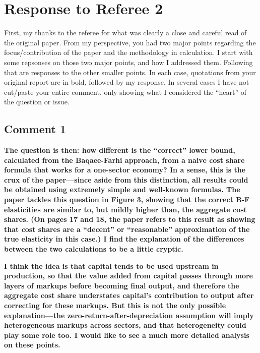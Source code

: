 \documentclass[11pt]{article}
\begin{document}


\section*{Response to Referee 2}
\onehalfspacing 

First, my thanks to the referee for what was clearly a close and careful read of the original paper. From my perspective, you had two major points regarding the focus/contribution of the paper and the methodology in calculation. I start with some repsonses on those two major points, and how I addressed them. Following that are responses to the other smaller points. In each case, quotations from your original report are in bold, followed by my response. In several cases I have not cut/paste your entire comment, only showing what I considered the ``heart'' of the question or issue.

\subsection*{Comment 1}
\textbf{The question is then: how different is the “correct” lower bound, calculated from the Baqaee-Farhi approach, from a naive cost share formula that works for a one-sector economy? In a sense, this is the crux of the paper—since aside from this distinction, all results could be obtained using extremely simple and well-known formulas. The paper tackles this question in Figure 3, showing that the correct B-F elasticities are similar to, but mildly higher than, the aggregate cost shares. (On pages 17 and 18, the paper refers to this result as showing that cost shares are a “decent” or “reasonable” approximation of the true elasticity in this case.) I find the explanation of the differences between the two calculations to be a little cryptic.}

\textbf{I think the idea is that capital tends to be used upstream in production, so that the value added from capital passes through more layers of markups before becoming final output, and therefore the aggregate cost share understates capital’s contribution to output after correcting for these markups. But this is not the only possible explanation—the zero-return-after-depreciation assumption will imply heterogeneous markups across sectors, and that heterogeneity could play some role too. I would like to see a much more detailed analysis on these points.}
\end{document}
